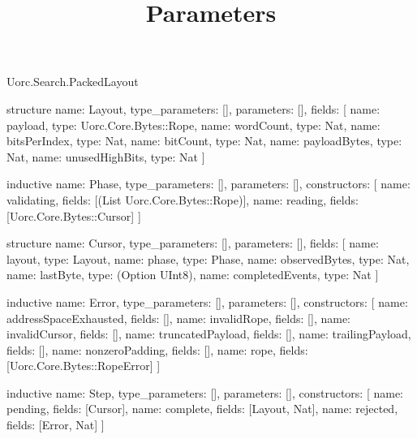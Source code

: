 \begin{lexlean}{Uorc.Search.PackedLayout}
\title{Parameters}
\begin{semanticmodule}
structure{
  name: Layout,
  type_parameters: [],
  parameters: [],
  fields: [
    {name: payload, type: Uorc.Core.Bytes::Rope},
    {name: wordCount, type: Nat},
    {name: bitsPerIndex, type: Nat},
    {name: bitCount, type: Nat},
    {name: payloadBytes, type: Nat},
    {name: unusedHighBits, type: Nat}
  ]
}

inductive{
  name: Phase,
  type_parameters: [],
  parameters: [],
  constructors: [
    {name: validating, fields: [(List Uorc.Core.Bytes::Rope)]},
    {name: reading, fields: [Uorc.Core.Bytes::Cursor]}
  ]
}

structure{
  name: Cursor,
  type_parameters: [],
  parameters: [],
  fields: [
    {name: layout, type: Layout},
    {name: phase, type: Phase},
    {name: observedBytes, type: Nat},
    {name: lastByte, type: (Option UInt8)},
    {name: completedEvents, type: Nat}
  ]
}

inductive{
  name: Error,
  type_parameters: [],
  parameters: [],
  constructors: [
    {name: addressSpaceExhausted, fields: []},
    {name: invalidRope, fields: []},
    {name: invalidCursor, fields: []},
    {name: truncatedPayload, fields: []},
    {name: trailingPayload, fields: []},
    {name: nonzeroPadding, fields: []},
    {name: rope, fields: [Uorc.Core.Bytes::RopeError]}
  ]
}

inductive{
  name: Step,
  type_parameters: [],
  parameters: [],
  constructors: [
    {name: pending, fields: [Cursor]},
    {name: complete, fields: [Layout, Nat]},
    {name: rejected, fields: [Error, Nat]}
  ]
}


\end{semanticmodule}
\end{lexlean}
